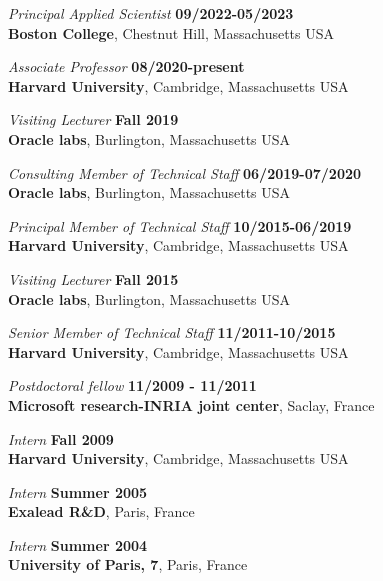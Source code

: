 \documentclass[margin,line]{res}
\begin{document}
\begin{resume}
{\em Principal Applied Scientist} \hfill {\bf 09/2022-05/2023}\\
{\bf Boston College}, Chestnut Hill, Massachusetts USA
\vspace{-.4cm}

{\em Associate Professor} \hfill {\bf 08/2020-present}\\
{\bf Harvard University}, Cambridge, Massachusetts USA
\vspace{-.4cm}

{\em Visiting Lecturer} \hfill {\bf Fall 2019}\\
{\bf Oracle labs}, Burlington, Massachusetts USA
\vspace{-.4cm}

{\em Consulting Member of Technical Staff} \hfill {\bf 06/2019-07/2020}\\
{\bf Oracle labs}, Burlington, Massachusetts USA
\vspace{-.4cm}

{\em Principal Member of Technical Staff} \hfill {\bf 10/2015-06/2019}\\
{\bf Harvard University}, Cambridge, Massachusetts USA
\vspace{-.4cm}

{\em Visiting Lecturer} \hfill {\bf Fall 2015}\\
{\bf Oracle labs}, Burlington, Massachusetts USA
\vspace{-.4cm}

{\em Senior Member of Technical Staff} \hfill {\bf 11/2011-10/2015}\\
       {\bf Harvard University}, Cambridge, Massachusetts USA
\vspace{-.4cm}

{\em Postdoctoral fellow} \hfill {\bf 11/2009 - 11/2011}\\
{\bf Microsoft research-INRIA joint center}, Saclay, France
\vspace{-.4cm}

{\em Intern} \hfill {\bf Fall 2009}\\
{\bf Harvard University}, Cambridge, Massachusetts USA

\vspace{-.4cm}
{\em Intern} \hfill {\bf Summer 2005}\\
{\bf Exalead R\&D}, Paris, France

\vspace{-.4cm}
{\em Intern} \hfill {\bf Summer 2004}\\
{\bf University of Paris, 7}, Paris, France


\end{resume}
\end{document}
